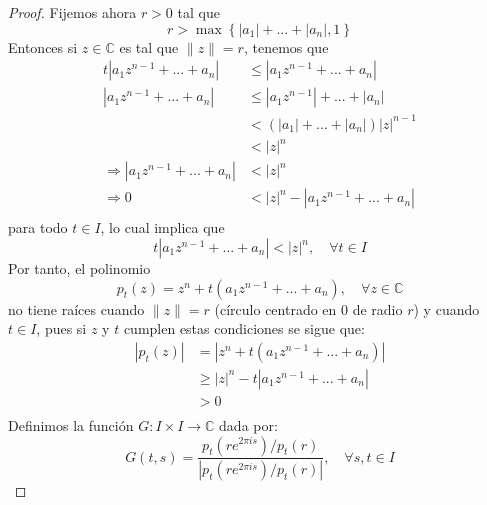 \documentclass[12pt]{report}
\theoremstyle{largebreak}
\newcommand\abs[1]{\ensuremath{\left|#1\right|}}
\newcommand\cf[3]{\ensuremath{#1:#2\rightarrow#3}}
\begin{document}
\begin{proof}
        Fijemos ahora $r>0$ tal que
        \begin{equation*}
            r>\max\left\{\abs{a_1}+...+\abs{a_n},1\right\}
        \end{equation*}
        Entonces si $z\in\mathbb{C}$ es tal que $\|z\|=r$, tenemos que
        \begin{equation*}
            \begin{split}
                t\abs{a_1z^{ n-1}+...+a_n}&\leq\abs{a_1z^{ n-1}+...+a_n}\\
                \abs{a_1z^{ n-1}+...+a_n}&\leq\abs{a_1z^{ n-1}}+...+\abs{a_n}\\
                &<(\abs{a_1}+...+\abs{a_n})\abs{z}^{n-1}\\
                &<\abs{z}^n\\
                \Rightarrow \abs{a_1z^{ n-1}+...+a_n}&<\abs{z}^n\\
                \Rightarrow 0 &< \abs{z}^n-\abs{a_1z^{ n-1}+...+a_n}\\
            \end{split}
        \end{equation*}
        para todo $t\in I$, lo cual implica que
        \begin{equation*}
            t\abs{a_1z^{ n-1}+...+a_n}<\abs{z}^n,\quad\forall t\in I
        \end{equation*}
        Por tanto, el polinomio
        \begin{equation*}
            p_t(z)=z^n+t\left(a_1z^{ n-1}+...+a_n \right),\quad\forall z\in\mathbb{C}
        \end{equation*}
        no tiene raíces cuando $\|z\|=r$ (círculo centrado en 0 de radio $r$) y cuando $t\in I$, pues si $z$ y $t$ cumplen estas condiciones se sigue que:
        \begin{equation*}
            \begin{split}
                \abs{p_t(z)}&=\abs{z^n+t\left(a_1z^{ n-1}+...+a_n \right)}\\
                &\geq\abs{z}^n-t\abs{a_1z^{ n-1}+...+a_n}\\
                &>0\\
            \end{split}
        \end{equation*}
        Definimos la función $\cf{G}{I\times I}{\mathbb{C}}$ dada por:
        \begin{equation*}
            G(t,s)=\frac{p_t(re^{ 2\pi is})/p_t(r)}{\abs{p_t(re^{ 2\pi is})/p_t(r)}},\quad\forall s,t\in I

\end{equation*}
\end{proof}
\end{document}
